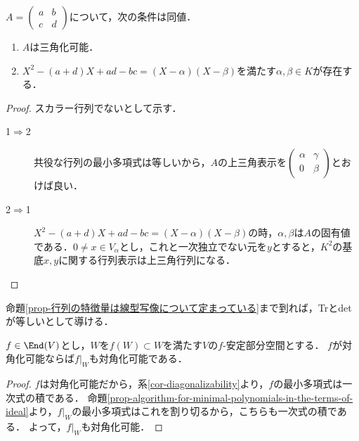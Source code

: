 \documentclass[uplatex, dvipdfmx]{jsreport}
\begin{document}
\begin{corollary}
    $A=\begin{pmatrix}a&b\\c&d\end{pmatrix}$について，次の条件は同値．
    \begin{enumerate}
        \item $A$は三角化可能．
        \item $X^2-(a+d)X+ad-bc=(X-\alpha)(X-\beta)$を満たす$\alpha,\beta\in K$が存在する．
    \end{enumerate}
\end{corollary}
\begin{proof}
    スカラー行列でないとして示す．
    \begin{description}
        \item[1$\Rightarrow$2] 共役な行列の最小多項式は等しいから，$A$の上三角表示を$\begin{pmatrix}\alpha&\gamma\\0&\beta\end{pmatrix}$とおけば良い．
        \item[2$\Rightarrow$1] $X^2-(a+d)X+ad-bc=(X-\alpha)(X-\beta)$の時，$\alpha,\beta$は$A$の固有値である．$0\ne x\in V_\alpha$とし，これと一次独立でない元を$y$とすると，$K^2$の基底$x,y$に関する行列表示は上三角行列になる．
    \end{description}
\end{proof}
\begin{remark}
    命題\ref{prop-行列の特徴量は線型写像について定まっている}まで到れば，Trとdetが等しいとして導ける．
\end{remark}

\begin{corollary}
    $f\in\End(V)$とし，$W$を$f(W)\subset W$を満たす$V$の$f$-安定部分空間とする．
    $f$が対角化可能ならば$f|_W$も対角化可能である．
\end{corollary}
\begin{proof}
    $f$は対角化可能だから，系\ref{cor-diagonalizability}より，$f$の最小多項式は一次式の積である．
    命題\ref{prop-algorithm-for-minimal-polynomials-in-the-terms-of-ideal}より，$f|_W$の最小多項式はこれを割り切るから，こちらも一次式の積である．
    よって，$f|_W$も対角化可能．
\end{proof}
\end{document}
